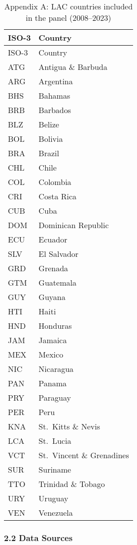 \documentclass[
  11pt,
]{article}
\begin{document}
\begin{longtable}[]{@{}ll@{}}
\caption{Appendix A: LAC countries included in the panel
(2008--2023)}\tabularnewline
\toprule\noalign{}
ISO-3 & Country \\
\midrule\noalign{}
\endfirsthead
\toprule\noalign{}
ISO-3 & Country \\
\midrule\noalign{}
\endhead
\bottomrule\noalign{}
\endlastfoot
ATG & Antigua \& Barbuda \\
ARG & Argentina \\
BHS & Bahamas \\
BRB & Barbados \\
BLZ & Belize \\
BOL & Bolivia \\
BRA & Brazil \\
CHL & Chile \\
COL & Colombia \\
CRI & Costa Rica \\
CUB & Cuba \\
DOM & Dominican Republic \\
ECU & Ecuador \\
SLV & El Salvador \\
GRD & Grenada \\
GTM & Guatemala \\
GUY & Guyana \\
HTI & Haiti \\
HND & Honduras \\
JAM & Jamaica \\
MEX & Mexico \\
NIC & Nicaragua \\
PAN & Panama \\
PRY & Paraguay \\
PER & Peru \\
KNA & St.~Kitts \& Nevis \\
LCA & St.~Lucia \\
VCT & St.~Vincent \& Grenadines \\
SUR & Suriname \\
TTO & Trinidad \& Tobago \\
URY & Uruguay \\
VEN & Venezuela \\
\end{longtable}

\subsubsection{2.2 Data Sources}\label{data-sources}
\end{document}

